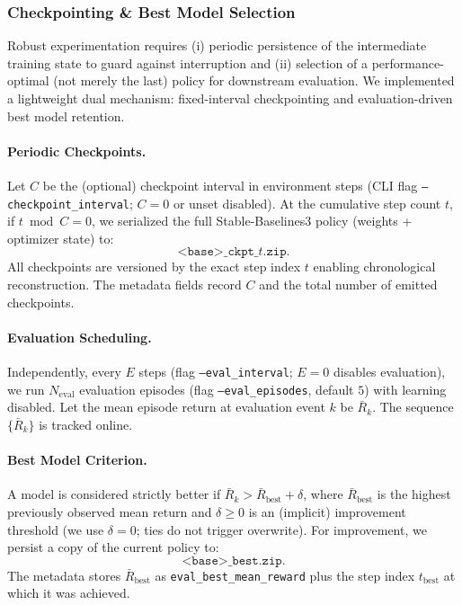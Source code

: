\subsubsection{Checkpointing \& Best Model Selection}

Robust experimentation requires (i) periodic persistence of the intermediate training state to guard against interruption and (ii) selection of a performance-optimal (not merely the last) policy for downstream evaluation. We implemented a lightweight dual mechanism: fixed-interval checkpointing and evaluation-driven best model retention.

\paragraph{Periodic Checkpoints.}
Let $C$ be the (optional) checkpoint interval in environment steps (CLI flag \texttt{--checkpoint\_interval}; $C=0$ or unset disabled). At the cumulative step count $t$, if $t \bmod C = 0$, we serialized the full Stable-Baselines3 policy (weights + optimizer state) to:
\[
\texttt{<base>}\_\texttt{ckpt\_}t\texttt{.zip}.
\]
All checkpoints are versioned by the exact step index $t$ enabling chronological reconstruction. The metadata fields record $C$ and the total number of emitted checkpoints.

\paragraph{Evaluation Scheduling.}
Independently, every $E$ steps (flag \texttt{--eval\_interval}; $E = 0$ disables evaluation), we run $N_{\text{eval}}$ evaluation episodes (flag \texttt{--eval\_episodes}, default $5$) with learning disabled. Let the mean episode return at evaluation event $k$ be $\bar{R}_k$. The sequence $\{\bar{R}_k\}$ is tracked online.

\paragraph{Best Model Criterion.}
A model is considered strictly better if $\bar{R}_k > \bar{R}_{\text{best}} + \delta$, where $\bar{R}_{\text{best}}$ is the highest previously observed mean return and $\delta \ge 0$ is an (implicit) improvement threshold (we use $\delta=0$; ties do not trigger overwrite). For improvement, we persist a copy of the current policy to:
\[
\texttt{<base>}\_\texttt{best.zip}.
\]
The metadata stores $\bar{R}_{\text{best}}$ as \texttt{eval\_best\_mean\_reward} plus the step index $t_{\text{best}}$ at which it was achieved.

